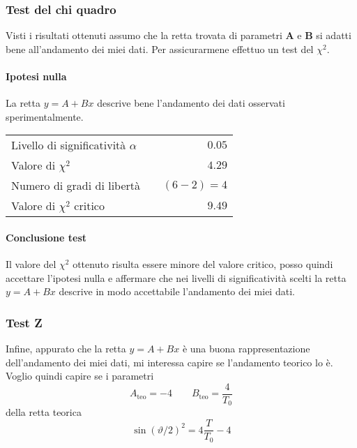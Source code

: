\documentclass{article}
\begin{document}
	
	
	\subsubsection{Test del chi quadro}
	Visti i risultati ottenuti assumo che la retta trovata di parametri $\mathbf{A}$ e $\mathbf{B}$ si adatti bene all'andamento dei miei dati. Per assicurarmene effettuo un test del $\chi^2$.
	
	\paragraph{Ipotesi nulla} La retta $y = A + Bx$ descrive bene l'andamento dei dati osservati sperimentalmente.
	
	\vspace{0.7cm}
	\begin{table}[H]
		\centering
		\begin{tabular}{lr} 
			Livello di significatività $\alpha$		&$\quad 0.05$  \\
			Valore di $\chi ^2$             	& $\quad 4.29$       \\
			Numero di gradi di libertà      	& $\quad (6-2) = 4$         \\   
			Valore di $\chi ^2$ critico     	& $\quad 9.49$
		\end{tabular}
	\end{table}
	\vspace{0.7cm}
	
	\paragraph{Conclusione test} Il valore del $\chi^2$ ottenuto risulta essere minore del valore critico, posso quindi accettare l'ipotesi nulla e affermare che nei livelli di significatività scelti la retta $y = A + Bx$ descrive in modo accettabile l'andamento dei miei dati.
	
	\subsubsection{Test Z}
	Infine, appurato che la retta $y = A + Bx$ è una buona rappresentazione dell'andamento dei miei dati, mi interessa capire se l'andamento teorico lo è. Voglio quindi capire se i parametri 
	\[
	A_\text{teo} = -4 \qquad B_\text{teo} =  \frac{4}{T_0}
	\]
	della retta teorica
	\[
	\sin{\left(\vartheta/2\right)}^2 = 4\frac{T}{T_0} - 4
	\]
\end{document}
